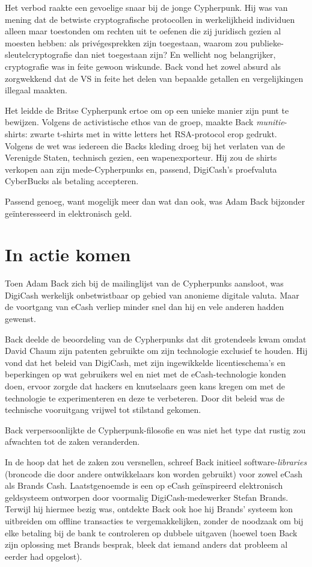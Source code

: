 \documentclass[
  a5paper,
  smalldemyvopaper,11pt,twoside,onecolumn,openright,extrafontsizes,
hidelinks]{memoir}
\begin{document}
Het verbod raakte een gevoelige snaar bij de jonge Cypherpunk. Hij was
van mening dat de betwiste cryptografische protocollen in werkelijkheid
individuen alleen maar toestonden om rechten uit te oefenen die zij
juridisch gezien al moesten hebben: als privégesprekken zijn toegestaan,
waarom zou publieke-sleutelcryptografie dan niet toegestaan zijn? En
wellicht nog belangrijker, cryptografie was in feite gewoon wiskunde.
Back vond het zowel absurd als zorgwekkend dat de VS in feite het delen
van bepaalde getallen en vergelijkingen illegaal maakten.

Het leidde de Britse Cypherpunk ertoe om op een unieke manier zijn punt
te bewijzen. Volgens de activistische ethos van de groep, maakte Back
\emph{munitie}-shirts: zwarte t-shirts met in witte letters het
RSA-protocol erop gedrukt. Volgens de wet was iedereen die Backs kleding
droeg bij het verlaten van de Verenigde Staten, technisch gezien, een
wapenexporteur. Hij zou de shirts verkopen aan zijn mede-Cypherpunks en,
passend, DigiCash's proefvaluta CyberBucks als betaling accepteren.

Passend genoeg, want mogelijk meer dan wat dan ook, was Adam Back
bijzonder geïnteresseerd in elektronisch geld.

\section{In actie komen}\label{in-actie-komen}

Toen Adam Back zich bij de mailinglijst van de Cypherpunks aansloot, was
DigiCash werkelijk onbetwistbaar op gebied van anonieme digitale valuta.
Maar de voortgang van eCash verliep minder snel dan hij en vele anderen
hadden gewenst.

Back deelde de beoordeling van de Cypherpunks dat dit grotendeels kwam
omdat David Chaum zijn patenten gebruikte om zijn technologie exclusief
te houden. Hij vond dat het beleid van DigiCash, met zijn ingewikkelde
licentieschema's en beperkingen op wat gebruikers wel en niet met de
eCash-technologie konden doen, ervoor zorgde dat hackers en knutselaars
geen kans kregen om met de technologie te experimenteren en deze te
verbeteren. Door dit beleid was de technische vooruitgang vrijwel tot
stilstand gekomen.

Back verpersoonlijkte de Cypherpunk-filosofie en was niet het type dat
rustig zou afwachten tot de zaken veranderden.

In de hoop dat het de zaken zou versnellen, schreef Back initieel
software-\emph{libraries} (broncode die door andere ontwikkelaars kon
worden gebruikt) voor zowel eCash als Brands Cash. Laatstgenoemde is een
op eCash geïnspireerd elektronisch geldsysteem ontworpen door voormalig
DigiCash-medewerker Stefan Brands. Terwijl hij hiermee bezig was,
ontdekte Back ook hoe hij Brands' systeem kon uitbreiden om offline
transacties te vergemakkelijken, zonder de noodzaak om bij elke betaling
bij de bank te controleren op dubbele uitgaven (hoewel toen Back zijn
oplossing met Brands besprak, bleek dat iemand anders dat probleem al
eerder had opgelost).
\end{document}
